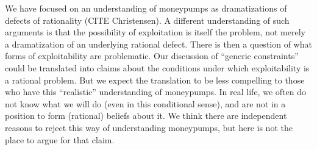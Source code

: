 \documentclass[11pt]{article}
\theoremstyle{definition}
\theoremstyle{definition}
\begin{document}
We have focused on an understanding of moneypumps as dramatizations of defects of rationality (CITE Christensen). A different understanding of such arguments is that the possibility of exploitation is itself the problem, not merely a dramatization of an underlying rational defect. There is then a question of what forms of exploitability are problematic. Our discussion of ``generic constraints'' could be translated into claims about the conditions under which exploitability is a rational problem. But we expect the translation to be less compelling to those who have this ``realistic'' understanding of moneypumps. In real life, we often do not know what we will do (even in this conditional sense), and are not in a position to form (rational) beliefs about it. We think there are independent reasons to reject this way of understanding moneypumps, but here is not the place to argue for that claim.

\end{document}
